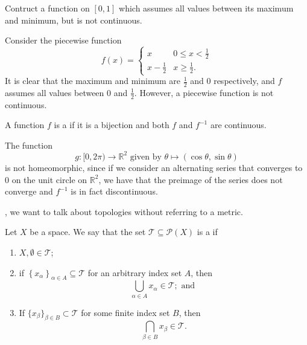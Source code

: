 \documentclass[notoc,notitlepage]{tufte-book}
\begin{document}
\begin{ex}
  Contruct a function on $[0, 1]$ which assumes all values between its maximum and minimum, but is not continuous.
\end{ex}

\begin{solution}
  Consider the piecewise function
  \begin{equation*}
    f(x) = \begin{cases}
      x & 0 \leq x < \frac{1}{2} \\
      x - \frac{1}{2} & x \geq \frac{1}{2}.
    \end{cases}
  \end{equation*}
  It is clear that the maximum and minimum are $\frac{1}{2}$ and $0$ respectively, and $f$ assumes all values between $0$ and $\frac{1}{2}$. However, a piecewise function is not continuous.
\end{solution}

\begin{defn}[Homeomorphism]\label{defn:homeomorphism}
  A function $f$ is a  if it is a bijection and both $f$ and $f^{-1}$ are continuous.
\end{defn}

\begin{eg}
  The function
  \begin{equation*}
    g : [ 0, 2\pi ) \to \mathbb{R}^2 \text{ given by } \theta \mapsto (\cos \theta, \sin \theta)
  \end{equation*}
  is not homeomorphic, since if we consider an alternating series that converges to $0$ on the unit circle on $\mathbb{R}^2$, we have that the preimage of the series does not converge and $f^{-1}$ is in fact discontinuous.
\end{eg}


, we want to talk about topologies without referring to a metric.

\begin{defn}[Topology]\label{defn:topology}
  Let $X$ be a space. We say that the set $\mathcal{T} \subseteq \mathcal{P}(X)$ is a  if
  \begin{enumerate}
    \item $X, \emptyset \in \mathcal{T}$;
    \item if $\left\{ x_\alpha \right\}_{\alpha \in A} \subseteq \mathcal{T}$ for an arbitrary index set $A$, then
      \begin{equation*}
        \bigcup_{\alpha \in A} x_\alpha \in \mathcal{T}; \text{ and }
      \end{equation*}
    \item If $\{ x_\beta \}_{\beta \in B} \subset \mathcal{T}$ for some finite index set $B$, then
      \begin{equation*}
        \bigcap_{\beta \in B} x_\beta \in \mathcal{T}.
      \end{equation*}
  \end{enumerate}
\end{defn}
\end{document}
